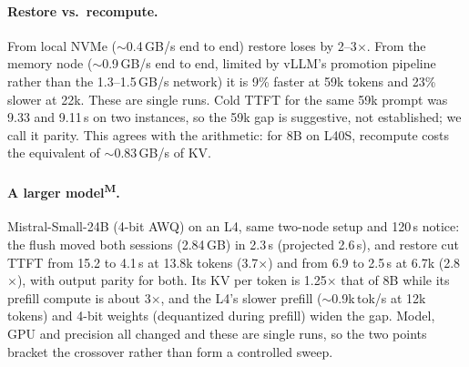 \documentclass[10pt,twocolumn]{article}
\newcommand{\Meas}{\textsuperscript{M}}
\begin{document}
\paragraph{Restore vs.\ recompute.} From local NVMe ($\sim$0.4\,GB/s end to end)
restore loses by 2--3$\times$. From the memory node ($\sim$0.9\,GB/s end to end, limited
by vLLM's promotion pipeline rather than the 1.3--1.5\,GB/s network) it is 9\% faster
at 59k tokens and 23\% slower at 22k. These are single runs. Cold TTFT for the same 59k
prompt was 9.33 and 9.11\,s on two instances, so the 59k gap is suggestive, not
established; we call it parity. This agrees with the arithmetic: for 8B on L40S,
recompute costs the equivalent of $\sim$0.83\,GB/s of KV.

\paragraph{A larger model\Meas.} Mistral-Small-24B (4-bit AWQ) on an L4, same two-node
setup and 120\,s notice: the flush moved both sessions (2.84\,GB) in 2.3\,s (projected
2.6\,s), and restore cut TTFT from 15.2 to 4.1\,s at 13.8k tokens (3.7$\times$) and from
6.9 to 2.5\,s at 6.7k (2.8$\times$), with output parity for both. Its KV per token is
1.25$\times$ that of 8B while its prefill compute is about 3$\times$, and the L4's slower
prefill ($\sim$0.9k\,tok/s at 12k tokens) and 4-bit weights (dequantized during
prefill) widen the gap. Model, GPU and precision all changed and these are single runs,
so the two points bracket the crossover rather than form a controlled
sweep.
\end{document}
